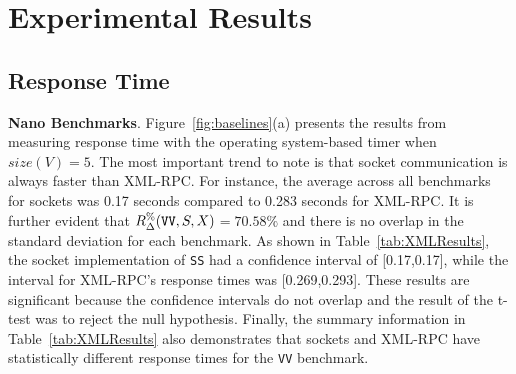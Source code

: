 \documentclass{sig-alternate}
\begin{document}
\vspace*{-.1in}
\section{Experimental Results}
\label{sec:results}

\subsection{Response Time}
\label{sec:time-overhead}




{\bf Nano Benchmarks}. Figure~\ref{fig:baselines}(a) presents the
results from measuring response time with the operating system-based
timer when $size(V)=5$.  The most important trend to note is that
socket communication is always faster than XML-RPC.  For instance, the
average across all benchmarks for sockets was 0.17 seconds compared to
0.283 seconds for XML-RPC.  It is further evident that {\small
  $R_\Delta^\%(\mbox{{\tt VV}},S,X)$}$ = 70.58\%$ and there is no
overlap in the standard deviation for each benchmark. As shown in
Table~\ref{tab:XMLResults}, the socket implementation of \texttt{SS}
had a confidence interval of [0.17,0.17], while the interval for
XML-RPC's response times was [0.269,0.293].  These results are
significant because the confidence intervals do not overlap and the
result of the t-test was to reject the null hypothesis.  Finally, the
summary information in Table~\ref{tab:XMLResults} also demonstrates
that sockets and XML-RPC have statistically different response times
for the \texttt{VV} benchmark.

\end{document}
